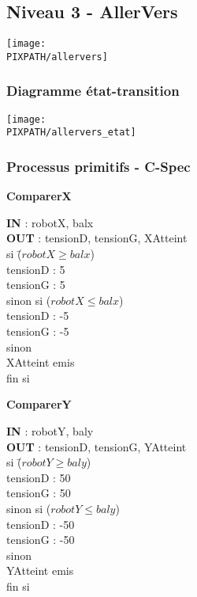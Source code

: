 \subsection{Niveau 3 - AllerVers}

\begin{center}
\texttt{[image: \\PIXPATH/allervers]}
\end{center}


\subsubsection{Diagramme état-transition}

\begin{center}
\texttt{[image: \\PIXPATH/allervers\_etat]}
\end{center}

\vfill
\pagebreak

\subsubsection{Processus primitifs - C-Spec}

\begin{description}
	
	\item \textbf{ComparerX}
		\begin{tabbing} 
		\textbf{IN} : robotX, balx \\
		\textbf{OUT} : tensionD, tensionG, XAtteint \\
		si \=($robotX \ge balx$) \\
			\>tensionD : 5 \\
			\>tensionG : 5 \\
		sinon si ($robotX \le balx$) \\ 
			\>tensionD : -5 \\
			\>tensionG : -5 \\
		sinon \\
			\>XAtteint emis \\
		fin si 
		\end{tabbing}

	\item \textbf{ComparerY}
		\begin{tabbing} 
		\textbf{IN} : robotY, baly \\
		\textbf{OUT} : tensionD, tensionG, YAtteint \\
		si \=($robotY \ge baly$) \\
			\>tensionD : 50 \\
			\>tensionG : 50 \\
		sinon si ($robotY \le baly$) \\
			\>tensionD : -50 \\
			\>tensionG : -50 \\
		sinon \\
			\>YAtteint emis \\
		fin si 
		\end{tabbing}


\end{description}

\vfill
\pagebreak

